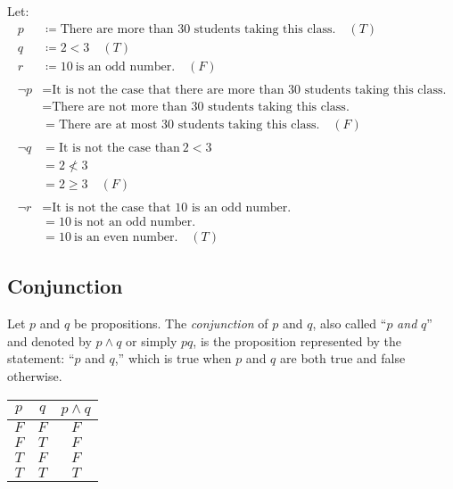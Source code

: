 \documentclass[letterpaper,12pt,fleqn]{article}
\begin{document}
\begin{examples}
  Let:
  \begin{align*}
    p &\coloneqq \text{There are more than 30 students taking this class.}\quad(T) \\
    q &\coloneqq 2<3\quad(T) \\
    r &\coloneqq 10\ \text{is an odd number.}\quad(F) \\
    \\
    \lnot{p} &= \text{It is not the case that there are more than 30 students taking this class.} \\
    &= \text{There are not more than 30 students taking this class.} \\
    &= \text{There are at most 30 students taking this class.}\quad(F) \\
    \\
    \lnot{q} &= \text{It is not the case than}\ 2<3 \\
    &= 2\nless3 \\
    &= 2\ge3\quad(F) \\
    \\
    \lnot{r} &= \text{It is not the case that 10 is an odd number.} \\
    &= 10\ \text{is not an odd number.} \\
    &= 10\ \text{is an even number.}\quad(T)
  \end{align*}
\end{examples}

\subsection*{Conjunction}

\begin{definition}[Conjunction]
  Let \(p\) and \(q\) be propositions.  The \emph{conjunction} of \(p\) and \(q\), also called ``\(p\) \emph{and}
  \(q\)'' and denoted by \(p\land q\) or simply \(pq\), is the proposition represented by the statement: ``\(p\)
  and \(q\),'' which is true when \(p\) and \(q\) are both true and false otherwise.

  \begin{center}
    \begin{tabular}{|cc|c|}
      \hline
      \(p\) & \(q\) & \(p\land q\) \\
      \hline
      \(F\) & \(F\) & \(F\) \\
      \hline
      \(F\) & \(T\) & \(F\) \\
      \hline
      \(T\) & \(F\) & \(F\) \\
      \hline
      \(T\) & \(T\) & \(T\) \\
      \hline
    \end{tabular}
  \end{center}
\end{definition}
\end{document}
